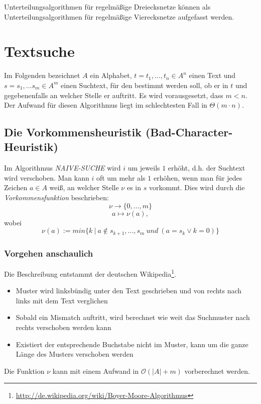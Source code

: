 Unterteilungsalgorithmen für regelmäßige Dreiecksnetze können als Unterteilungsalgorithmen für regelmäßige Vierecksnetze aufgefasst werden.



\section{Textsuche}
Im Folgenden bezeichnet \(A\) ein Alphabet, \(t = t_1,...,t_n \in A^n\) einen Text und \(s = s_1,...s_m \in A^m\) einen Suchtext, für den bestimmt werden soll, ob er in \(t\) und gegebenenfalls an welcher Stelle er auftritt. Es wird vorausgesetzt, dass \(m < n\).
\text{}\\

Der Aufwand für diesen Algorithmus liegt im schlechtesten Fall in \(\Theta(m\cdot n)\).


\subsection{Die Vorkommensheuristik (Bad-Character-Heuristik)}
Im Algorithmus \textit{NAIVE-SUCHE} wird \(i\) um jeweils \(1\) erhöht, d.h. der Suchtext wird verschoben. Man kann \(i\) oft um mehr als \(1\) erhöhen, wenn man für jedes Zeichen \(a \in A\) weiß, an welcher Stelle \(\nu\) es in \(s\) vorkommt. Dies wird durch die \textit{Vorkommensfunktion} beschrieben:
\[\nu \rightarrow \{0,...,m\}\]
\[a \mapsto \nu(a),\]
wobei
\[\nu(a) := min\{k~|~a \notin s_{k+1},...,s_m~und~(a=s_k \lor k=0)\}\]

\subsubsection{Vorgehen anschaulich}
Die Beschreibung entstammt der deutschen Wikipedia\footnote{\url{http://de.wikipedia.org/wiki/Boyer-Moore-Algorithmus}}.
\begin{itemize}
	\item Muster wird linksbündig unter den Text geschrieben und von rechts nach links mit dem Text verglichen
	\item Sobald ein Mismatch auftritt, wird berechnet wie weit das Suchmuster nach rechts verschoben werden kann
	\item Existiert der entsprechende Buchstabe nicht im Muster, kann um die ganze Länge des Musters verschoben werden
\end{itemize}
Die Funktion \(\nu\) kann mit einem Aufwand in \(\mathcal{O}(|A|+m)\) vorberechnet werden.


